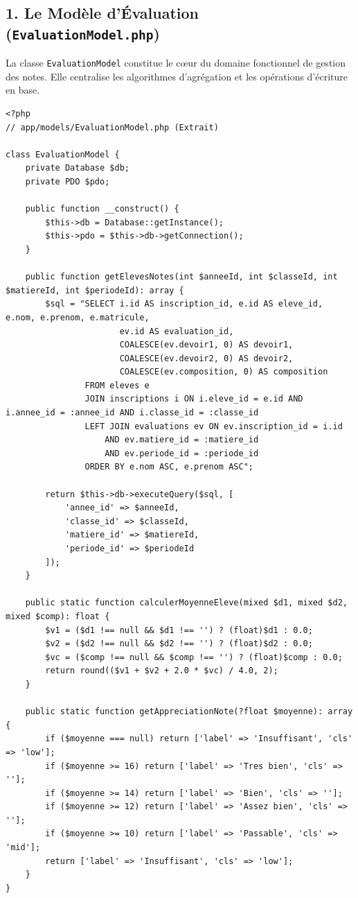 \documentclass[11pt,a4paper,oneside]{report}
\begin{document}
\subsection{1. Le Modèle d'Évaluation (\texttt{EvaluationModel.php})}
La classe \texttt{EvaluationModel} constitue le c{\oe}ur du domaine fonctionnel de gestion des notes. Elle centralise les algorithmes d'agrégation et les opérations d'écriture en base.

\begin{lstlisting}[language=PHP8, caption={Structure et méthodes de la classe EvaluationModel}]
<?php
// app/models/EvaluationModel.php (Extrait)

class EvaluationModel {
    private Database $db;
    private PDO $pdo;

    public function __construct() {
        $this->db = Database::getInstance();
        $this->pdo = $this->db->getConnection();
    }

    public function getElevesNotes(int $anneeId, int $classeId, int $matiereId, int $periodeId): array {
        $sql = "SELECT i.id AS inscription_id, e.id AS eleve_id, e.nom, e.prenom, e.matricule,
                       ev.id AS evaluation_id,
                       COALESCE(ev.devoir1, 0) AS devoir1,
                       COALESCE(ev.devoir2, 0) AS devoir2,
                       COALESCE(ev.composition, 0) AS composition
                FROM eleves e
                JOIN inscriptions i ON i.eleve_id = e.id AND i.annee_id = :annee_id AND i.classe_id = :classe_id
                LEFT JOIN evaluations ev ON ev.inscription_id = i.id 
                    AND ev.matiere_id = :matiere_id 
                    AND ev.periode_id = :periode_id
                ORDER BY e.nom ASC, e.prenom ASC";

        return $this->db->executeQuery($sql, [
            'annee_id' => $anneeId,
            'classe_id' => $classeId,
            'matiere_id' => $matiereId,
            'periode_id' => $periodeId
        ]);
    }

    public static function calculerMoyenneEleve(mixed $d1, mixed $d2, mixed $comp): float {
        $v1 = ($d1 !== null && $d1 !== '') ? (float)$d1 : 0.0;
        $v2 = ($d2 !== null && $d2 !== '') ? (float)$d2 : 0.0;
        $vc = ($comp !== null && $comp !== '') ? (float)$comp : 0.0;
        return round(($v1 + $v2 + 2.0 * $vc) / 4.0, 2);
    }

    public static function getAppreciationNote(?float $moyenne): array {
        if ($moyenne === null) return ['label' => 'Insuffisant', 'cls' => 'low'];
        if ($moyenne >= 16) return ['label' => 'Tres bien', 'cls' => ''];
        if ($moyenne >= 14) return ['label' => 'Bien', 'cls' => ''];
        if ($moyenne >= 12) return ['label' => 'Assez bien', 'cls' => ''];
        if ($moyenne >= 10) return ['label' => 'Passable', 'cls' => 'mid'];
        return ['label' => 'Insuffisant', 'cls' => 'low'];
    }
}
\end{lstlisting}
\end{document}
